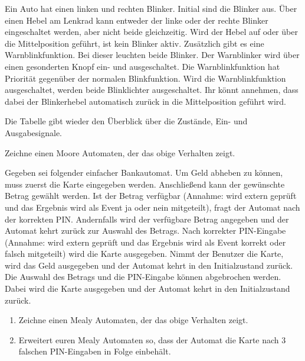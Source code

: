 Ein Auto hat einen linken und rechten Blinker. Initial sind die Blinker aus. Über einen Hebel am Lenkrad kann
entweder der linke oder der rechte Blinker eingeschaltet werden, aber nicht beide gleichzeitig. Wird der Hebel auf
oder über die Mittelposition geführt, ist kein Blinker aktiv. Zusätzlich gibt es eine Warnblinkfunktion. Bei dieser
leuchten beide Blinker. Der Warnblinker wird über einen gesonderten Knopf ein- und ausgeschaltet. Die Warnblinkfunktion
hat Priorität gegenüber der normalen Blinkfunktion. Wird die Warnblinkfunktion ausgeschaltet,
werden beide Blinklichter ausgeschaltet. Ihr könnt annehmen, dass dabei der Blinkerhebel automatisch zurück
in die Mittelposition geführt wird.

Die Tabelle gibt wieder den Überblick über die Zustände, Ein- und Ausgabesignale.
\begin{table}[h]
\centering
\footnotesize
{}
\end{table}

Zeichne einen Moore Automaten, der das obige Verhalten zeigt. 

Gegeben sei folgender einfacher Bankautomat. Um Geld abheben zu können, muss zuerst die Karte eingegeben
werden. Anschließend kann der gewünschte Betrag gewählt werden. Ist der Betrag verfügbar (Annahme: wird extern geprüft und das Ergebnis wird als Event ja oder nein mitgeteilt), fragt der Automat nach der korrekten
PIN. Andernfalls wird der verfügbare Betrag angegeben und der Automat kehrt zurück zur Auswahl des Betrags.
Nach korrekter PIN-Eingabe (Annahme: wird extern geprüft und das Ergebnis wird als Event korrekt oder
falsch mitgeteilt) wird die Karte ausgegeben. Nimmt der Benutzer die Karte, wird das Geld ausgegeben und
der Automat kehrt in den Initialzustand zurück.
Die Auswahl des Betrags und die PIN-Eingabe können abgebrochen werden. Dabei wird die Karte ausgegeben
und der Automat kehrt in den Initialzustand zurück.

\begin{enumerate}
    \item Zeichne einen Mealy Automaten, der das obige Verhalten zeigt.
    \item Erweitert euren Mealy Automaten so, dass der Automat die Karte nach 3 falschen PIN-Eingaben in Folge einbehält.
\end{enumerate}


